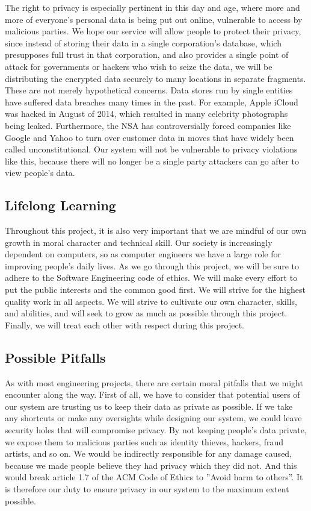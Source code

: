 	The right to privacy is especially pertinent in this day and age, where more and more of everyone’s personal data is being put out online, vulnerable to access by malicious parties.  We hope our service will allow people to protect their privacy, since instead of storing their data in a single corporation’s database, which presupposes full trust in that corporation, and also provides a single point of attack for governments or hackers who wish to seize the data, we will be distributing the encrypted data securely to many locations in separate fragments.  These are not merely hypothetical concerns.  Data stores run by single entities have suffered data breaches many times in the past.  For example, Apple iCloud was hacked in August of 2014, which resulted in many celebrity photographs being leaked. \cite{independent}  Furthermore, the NSA has controversially forced companies like Google and Yahoo to turn over customer data in moves that have widely been called unconstitutional. \cite{gizmodo}  Our system will not be vulnerable to privacy violations like this, because there will no longer be a single party attackers can go after to view people's data.

\subsection{Lifelong Learning}

	Throughout this project, it is also very important that we are mindful of our own growth in moral character and technical skill.  Our society is increasingly dependent on computers, so as computer engineers we have a large role for improving people’s daily lives.  As we go through this project, we will be sure to adhere to the Software Engineering code of ethics.  We will make every effort to put the public interests and the common good first.  We will strive for the highest quality work in all aspects.  We will strive to cultivate our own character, skills, and abilities, and will seek to grow as much as possible through this project.  Finally, we will treat each other with respect during this project.

\subsection{Possible Pitfalls}
	As with most engineering projects, there are certain moral pitfalls that we might encounter along the way.  First of all, we have to consider that potential users of our system are trusting us to keep their data as private as possible.  If we take any shortcuts or make any oversights while designing our system, we could leave security holes that will compromise privacy.  By not keeping people's data private, we expose them to malicious parties such as identity thieves, hackers, fraud artists, and so on.  We would be indirectly responsible for any damage caused, because we made people believe they had privacy which they did not.  And this would break article 1.7 of the ACM Code of Ethics to ''Avoid harm to others''. \cite{acmethics}  It is therefore our duty to ensure privacy in our system to the maximum extent possible.

